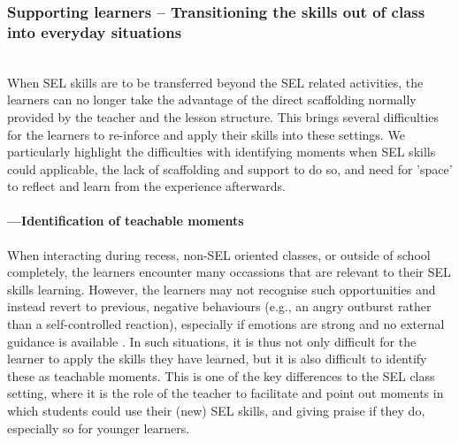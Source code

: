 \documentclass[prodmode,acmtochi]{acmsmall}
\newcommand{\todo}[1]{\textrm{\textrm{\textcolor{LightBlue}{[[#1]]} } } }
\begin{document}
\subsubsection{Supporting learners  -- Transitioning the skills out of class into everyday situations}
\label{sec:Embedding-learners} ~ \\
When SEL skills are to be transferred beyond the SEL related activities, the learners can no longer take the advantage of the direct scaffolding normally provided by the teacher and the lesson structure. This brings several difficulties for the learners to re-inforce and apply their skills into these settings. We particularly highlight the difficulties with identifying moments when SEL skills could applicable, the lack of scaffolding and support to do so, and need for 'space' to reflect and learn from the experience afterwards. 


\paragraph{---Identification of teachable moments}
When interacting during recess, non-SEL oriented classes, or outside of school completely, the learners encounter many occassions that are relevant to their SEL skills learning. However, the learners may not recognise such opportunities and instead revert to previous, negative behaviours (e.g., an angry outburst rather than a self-controlled reaction), especially if emotions are strong and no external guidance is available \cite[p. 56]{Elias}.  In such situations, it is thus not only difficult for the learner to apply the skills they have learned, but it is also difficult to identify these as teachable moments. This is one of the key differences to the SEL class setting, where it is the role of the teacher to facilitate and point out moments in which students could use their (new) SEL skills, and giving praise if they do, especially so for younger learners.
\end{document}
